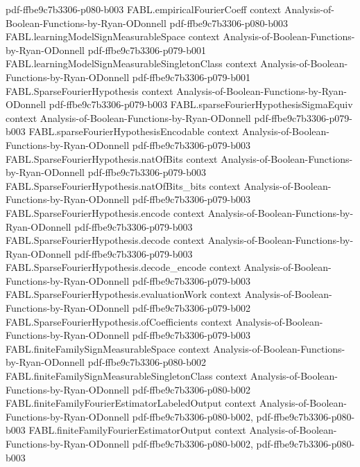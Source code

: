 \begin{theorem}
  {pdf-ffbe9c7b3306-p080-b003}
\proofstep
  {FABL.empiricalFourierCoeff}
  {context}
  {Analysis-of-Boolean-Functions-by-Ryan-ODonnell}
  {pdf-ffbe9c7b3306-p080-b003}
\proofstep
  {FABL.learningModelSignMeasurableSpace}
  {context}
  {Analysis-of-Boolean-Functions-by-Ryan-ODonnell}
  {pdf-ffbe9c7b3306-p079-b001}
\proofstep
  {FABL.learningModelSignMeasurableSingletonClass}
  {context}
  {Analysis-of-Boolean-Functions-by-Ryan-ODonnell}
  {pdf-ffbe9c7b3306-p079-b001}
\proofstep
  {FABL.SparseFourierHypothesis}
  {context}
  {Analysis-of-Boolean-Functions-by-Ryan-ODonnell}
  {pdf-ffbe9c7b3306-p079-b003}
\proofstep
  {FABL.sparseFourierHypothesisSigmaEquiv}
  {context}
  {Analysis-of-Boolean-Functions-by-Ryan-ODonnell}
  {pdf-ffbe9c7b3306-p079-b003}
\proofstep
  {FABL.sparseFourierHypothesisEncodable}
  {context}
  {Analysis-of-Boolean-Functions-by-Ryan-ODonnell}
  {pdf-ffbe9c7b3306-p079-b003}
\proofstep
  {FABL.SparseFourierHypothesis.natOfBits}
  {context}
  {Analysis-of-Boolean-Functions-by-Ryan-ODonnell}
  {pdf-ffbe9c7b3306-p079-b003}
\proofstep
  {FABL.SparseFourierHypothesis.natOfBits_bits}
  {context}
  {Analysis-of-Boolean-Functions-by-Ryan-ODonnell}
  {pdf-ffbe9c7b3306-p079-b003}
\proofstep
  {FABL.SparseFourierHypothesis.encode}
  {context}
  {Analysis-of-Boolean-Functions-by-Ryan-ODonnell}
  {pdf-ffbe9c7b3306-p079-b003}
\proofstep
  {FABL.SparseFourierHypothesis.decode}
  {context}
  {Analysis-of-Boolean-Functions-by-Ryan-ODonnell}
  {pdf-ffbe9c7b3306-p079-b003}
\proofstep
  {FABL.SparseFourierHypothesis.decode_encode}
  {context}
  {Analysis-of-Boolean-Functions-by-Ryan-ODonnell}
  {pdf-ffbe9c7b3306-p079-b003}
\proofstep
  {FABL.SparseFourierHypothesis.evaluationWork}
  {context}
  {Analysis-of-Boolean-Functions-by-Ryan-ODonnell}
  {pdf-ffbe9c7b3306-p079-b002}
\proofstep
  {FABL.SparseFourierHypothesis.ofCoefficients}
  {context}
  {Analysis-of-Boolean-Functions-by-Ryan-ODonnell}
  {pdf-ffbe9c7b3306-p079-b003}
\proofstep
  {FABL.finiteFamilySignMeasurableSpace}
  {context}
  {Analysis-of-Boolean-Functions-by-Ryan-ODonnell}
  {pdf-ffbe9c7b3306-p080-b002}
\proofstep
  {FABL.finiteFamilySignMeasurableSingletonClass}
  {context}
  {Analysis-of-Boolean-Functions-by-Ryan-ODonnell}
  {pdf-ffbe9c7b3306-p080-b002}
\proofstep
  {FABL.finiteFamilyFourierEstimatorLabeledOutput}
  {context}
  {Analysis-of-Boolean-Functions-by-Ryan-ODonnell}
  {pdf-ffbe9c7b3306-p080-b002,
    pdf-ffbe9c7b3306-p080-b003}
\proofstep
  {FABL.finiteFamilyFourierEstimatorOutput}
  {context}
  {Analysis-of-Boolean-Functions-by-Ryan-ODonnell}
  {pdf-ffbe9c7b3306-p080-b002,
    pdf-ffbe9c7b3306-p080-b003}

\end{theorem}
